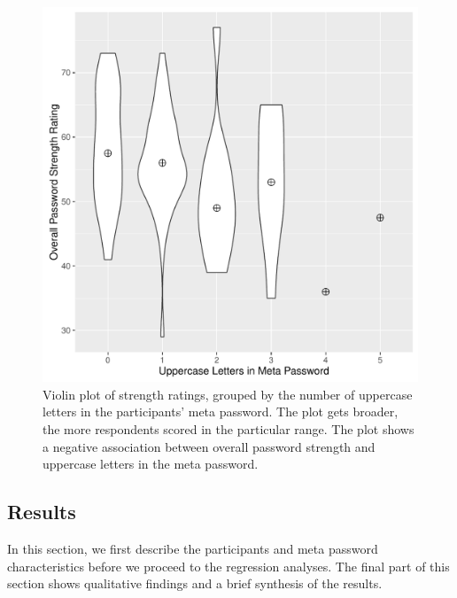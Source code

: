 \begin{figure}
	\centering
	\includegraphics[width=\linewidth]{figures/MetaPW-Violinplot}
	\caption{\label{fig:MetaPW-ViolinPlot} Violin plot of strength ratings, grouped by the number of uppercase letters in the participants' meta password. The plot gets broader, the more respondents scored in the particular range. The plot shows a negative association between overall password strength and uppercase letters in the meta password.}
\end{figure}



\subsection{Results}
In this section, we first describe the participants and meta password characteristics before we proceed to the regression analyses. The final part of this section shows qualitative findings and a brief synthesis of the results. 

